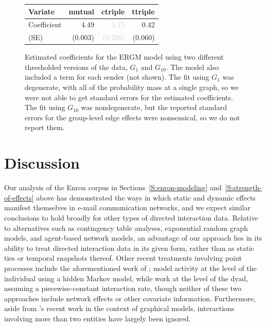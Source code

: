\documentclass[final]{statsoc}
\begin{document}
\begin{figure}
{\begin{tabular}{lrrr}
  \toprule
  Variate
  & \textbf{mutual}
  & \textbf{ctriple}
  & \textbf{ttriple}
  \\
  \midrule
  Coefficient
  & 4.49
  & \textcolor{LightGray}{0.15}
  & 0.42
  \\
  (SE)
  & \tiny{(0.003)}
  & \textcolor{LightGray}{\tiny{(0.290)}}
  & \tiny{(0.060)}
  \\
  \bottomrule
  \end{tabular}
}
\normalsize
\caption{Estimated coefficients for the ERGM model using two different
thresholded versions of the data, $G_1$ and $G_{10}$.  The model also included a
term for each sender (not shown).
The fit using $G_1$ was degenerate, with all of the probability mass at a
single graph, so we were not able to get standard errors for the estimated
coefficients.  The fit using $G_{10}$ was nondegenerate, but the reported
standard errors for the group-level edge effects were nonsensical, so we do
not report them.
}
\end{figure}

\FloatBarrier

\section{Discussion}\label{S:discussion}

Our analysis of the Enron corpus in Sections~\ref{S:enron-modeling} and~\ref{S:strength-of-effects} above
has demonstrated the ways in which static and dynamic effects manifest
themselves in e-mail communication networks, and we expect similar
conclusions to hold broadly for other types of directed interaction
data.  Relative to alternatives such as contingency table analyses,
exponential random graph models, and agent-based network models, an
advantage of our approach lies in its ability to treat directed
interaction data in its given form, rather than as static ties or
temporal snapshots thereof.  Other recent treatments involving point
processes include the aforementioned work of
\cite{butts2008relational}; \citet{malmgen2009characterizing} model
activity at the level of the individual using a hidden Markov model,
while \citet{heard2010bayesian} work at the level of the dyad,
assuming a piecewise-constant interaction rate, though neither of
these two approaches include network effects or other covariate
information.  Furthermore, aside from
's
\citeyearpar{lunagomez2009geometric} recent work in the context of
graphical models, interactions involving more than two entities have
largely been ignored.
\end{document}
